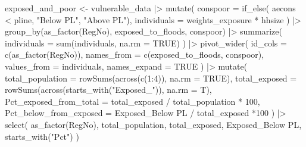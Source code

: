 \documentclass[
  letterpaper,
  DIV=11,
  numbers=noendperiod]{scrartcl}
\newenvironment{Shaded}{}{}
\newcommand{\AttributeTok}[1]{\textcolor[rgb]{0.84,0.23,0.29}{#1}}
\newcommand{\ConstantTok}[1]{\textcolor[rgb]{0.00,0.36,0.77}{#1}}
\newcommand{\DecValTok}[1]{\textcolor[rgb]{0.00,0.36,0.77}{#1}}
\newcommand{\FunctionTok}[1]{\textcolor[rgb]{0.44,0.26,0.76}{#1}}
\newcommand{\NormalTok}[1]{\textcolor[rgb]{0.14,0.16,0.18}{#1}}
\newcommand{\OtherTok}[1]{\textcolor[rgb]{0.44,0.26,0.76}{#1}}
\newcommand{\SpecialCharTok}[1]{\textcolor[rgb]{0.00,0.36,0.77}{#1}}
\newcommand{\StringTok}[1]{\textcolor[rgb]{0.01,0.18,0.38}{#1}}
\begin{document}
\begin{Shaded}
\begin{Highlighting}[]
\NormalTok{exposed\_and\_poor }\OtherTok{\textless{}{-}}\NormalTok{ vulnerable\_data }\SpecialCharTok{|\textgreater{}}
  \FunctionTok{mutate}\NormalTok{(}
    \AttributeTok{conspoor =} \FunctionTok{if\_else}\NormalTok{(}
\NormalTok{      aecons }\SpecialCharTok{\textless{}}\NormalTok{ pline, }\StringTok{"Below PL"}\NormalTok{, }\StringTok{"Above PL"}\NormalTok{),}
    \AttributeTok{individuals =}\NormalTok{ weights\_exposure }\SpecialCharTok{*}\NormalTok{ hhsize}
\NormalTok{  ) }\SpecialCharTok{|\textgreater{}} 
  \FunctionTok{group\_by}\NormalTok{(}\FunctionTok{as\_factor}\NormalTok{(RegNo), exposed\_to\_floods, conspoor) }\SpecialCharTok{|\textgreater{}} 
  \FunctionTok{summarize}\NormalTok{(}
    \AttributeTok{individuals =} \FunctionTok{sum}\NormalTok{(individuals, }\AttributeTok{na.rm =} \ConstantTok{TRUE}\NormalTok{)}
\NormalTok{  ) }\SpecialCharTok{|\textgreater{}} 
  \FunctionTok{pivot\_wider}\NormalTok{(}
    \AttributeTok{id\_cols =} \FunctionTok{c}\NormalTok{(}\StringTok{\textasciigrave{}}\AttributeTok{as\_factor(RegNo)}\StringTok{\textasciigrave{}}\NormalTok{),}
    \AttributeTok{names\_from =} \FunctionTok{c}\NormalTok{(exposed\_to\_floods, conspoor),}
    \AttributeTok{values\_from =}\NormalTok{ individuals,}
    \AttributeTok{names\_expand =} \ConstantTok{TRUE}
\NormalTok{  ) }\SpecialCharTok{|\textgreater{}} 
  \FunctionTok{mutate}\NormalTok{(}
    \AttributeTok{total\_population =} \FunctionTok{rowSums}\NormalTok{(}\FunctionTok{across}\NormalTok{(}\FunctionTok{c}\NormalTok{(}\DecValTok{1}\SpecialCharTok{:}\DecValTok{4}\NormalTok{)), }\AttributeTok{na.rm =} \ConstantTok{TRUE}\NormalTok{),}
    \AttributeTok{total\_exposed =} \FunctionTok{rowSums}\NormalTok{(}\FunctionTok{across}\NormalTok{(}\FunctionTok{starts\_with}\NormalTok{(}\StringTok{"Exposed\_"}\NormalTok{)), }\AttributeTok{na.rm =}\NormalTok{ T),}
    \AttributeTok{Pct\_exposed\_from\_total =}\NormalTok{ total\_exposed }\SpecialCharTok{/}\NormalTok{ total\_population }\SpecialCharTok{*} \DecValTok{100}\NormalTok{,}
    \AttributeTok{Pct\_below\_from\_exposed =} \StringTok{\textasciigrave{}}\AttributeTok{Exposed\_Below PL}\StringTok{\textasciigrave{}} \SpecialCharTok{/}\NormalTok{ total\_exposed }\SpecialCharTok{*}\DecValTok{100}
\NormalTok{  ) }\SpecialCharTok{|\textgreater{}} 
  \FunctionTok{select}\NormalTok{(}
    \StringTok{\textasciigrave{}}\AttributeTok{as\_factor(RegNo)}\StringTok{\textasciigrave{}}\NormalTok{,}
\NormalTok{    total\_population,}
\NormalTok{    total\_exposed,}
    \StringTok{\textasciigrave{}}\AttributeTok{Exposed\_Below PL}\StringTok{\textasciigrave{}}\NormalTok{,}
    \FunctionTok{starts\_with}\NormalTok{(}\StringTok{"Pct"}\NormalTok{)}
\NormalTok{  )}


\end{Highlighting}
\end{Shaded}
\end{document}
